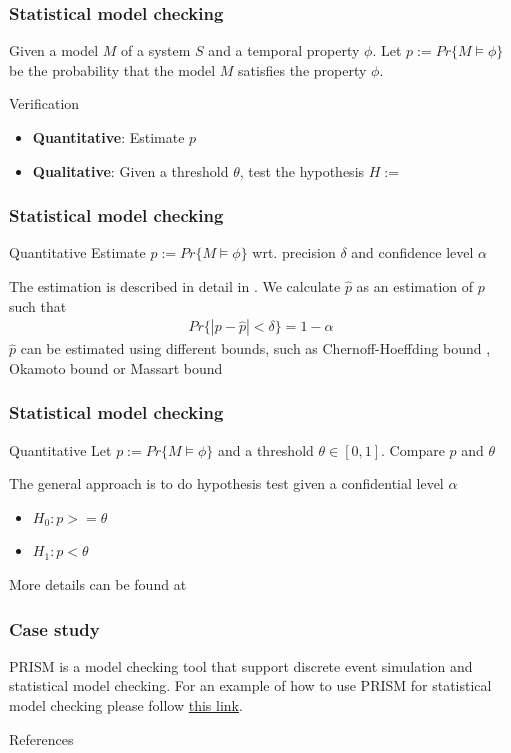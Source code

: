 \documentclass{beamer}
\begin{document}
\begin{frame}
    \frametitle{Statistical model checking}
    Given a model $M$ of a system $S$ and a temporal property $\phi$. Let $p:=Pr\{M \models \phi \}$ be the probability that the model $M$ satisfies the property $\phi$. \footnotemark[1]
    \begin{block}{Verification}
        \begin{itemize}
            \item \textbf{Quantitative}: Estimate $p$
            \item \textbf{Qualitative}: Given a threshold $\theta$, test the hypothesis $H := $
        \end{itemize}
    \end{block}
\end{frame}

\begin{frame}
    \frametitle{Statistical model checking}
    \begin{block}{Quantitative}
        Estimate $p:=Pr\{M \models \phi \}$ wrt. precision $\delta$ and confidence level $\alpha$
    \end{block}
    The estimation is described in detail in \cite{agha2018survey}. We calculate $\hat{p}$ as an estimation of $p$ such that
    \begin{align*}
        Pr\{ |p - \hat{p}| < \delta \} = 1 - \alpha
    \end{align*}
    $\hat{p}$ can be estimated using different bounds, such as Chernoff-Hoeffding bound \cite{hoeffding1963probability}, Okamoto bound \cite{okamoto1959some} or Massart bound \cite{massart1990tight}
\end{frame}

\begin{frame}
    \frametitle{Statistical model checking}
    \begin{block}{Quantitative}
        Let $p:=Pr\{M \models \phi \}$ and a threshold $\theta \in [0,1]$. Compare $p$ and $\theta$
    \end{block}
    The general approach is to do hypothesis test \cite{younes2005verification} given a confidential level $\alpha$
    \begin{itemize}
        \item $H_0: p >= \theta$
        \item $H_1: p < \theta$
    \end{itemize}
    More details can be found at \cite{wald1945sequential}
\end{frame}

\begin{frame}
    \frametitle{Case study}
    PRISM \cite{kwiatkowska2002prism} is a model checking tool that support discrete event simulation and statistical model checking.
    For an example of how to use PRISM for statistical model checking please follow \href{https://www.prismmodelchecker.org/manual/RunningPRISM/StatisticalModelChecking}{this link}.
\end{frame}

\begin{frame}[allowframebreaks]{References}
    \printbibliography
\end{frame}
\end{document}
